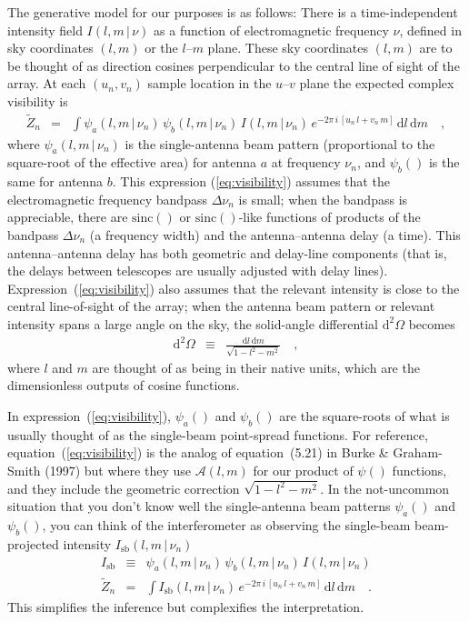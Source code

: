 \documentclass[12pt]{article}
\renewcommand{\exp}[1]{e^{#1}}
\newcommand{\sinc}{\mathrm{sinc}}
\newcommand{\given}{\,|\,}
\newcommand{\expectation}[1]{\tilde{#1}}
\newcommand{\dd}{\mathrm{d}}
\newcommand{\singlebeam}{_\mathrm{sb}}
\begin{document}
The generative model for our purposes is as follows: There is a
time-independent intensity field $I(l,m\given\nu)$ as a function of
electromagnetic frequency $\nu$, defined in sky coordinates $(l,m)$ or
the $l$--$m$ plane.  These sky coordinates $(l, m)$ are to be thought
of as direction cosines perpendicular to the central line of sight of
the array.  At each $(u_n, v_n)$ sample location in the $u$--$v$ plane
the expected complex visibility is
\begin{eqnarray}
\label{eq:visibility}
\expectation{Z}_n &=& \int \psi_a(l,m\given\nu_n)\,\psi_b(l,m\given\nu_n)\,I(l,m\given\nu_n)
                         \,\exp{-2\pi\,i\,[u_n\,l + v_n\,m]}\,\dd l\,\dd m
\quad ,
\end{eqnarray}
where $\psi_a(l,m\given\nu_n)$ is the single-antenna beam pattern
(proportional to the square-root of the effective area) for antenna
$a$ at frequency $\nu_n$, and $\psi_b()$ is the same for antenna $b$.
This expression (\ref{eq:visibility}) assumes that the electromagnetic
frequency bandpass $\Delta\nu_n$ is small; when the bandpass is
appreciable, there are $\sinc()$ or $\sinc()$-like functions of
products of the bandpass $\Delta\nu_n$ (a frequency width) and the
antenna--antenna delay (a time).  This antenna--antenna delay has both
geometric and delay-line components (that is, the delays between
telescopes are usually adjusted with delay lines).
Expression~(\ref{eq:visibility}) also assumes that the relevant
intensity is close to the central line-of-sight of the array; when the
antenna beam pattern or relevant intensity spans a large angle on the
sky, the solid-angle differential $\dd^2\Omega$ becomes
\begin{eqnarray}
\dd^2\Omega &\equiv& \frac{\dd l\,\dd m}{\sqrt{1-l^2-m^2}}
\quad ,
\end{eqnarray}
where $l$ and $m$ are thought of as being in their native units, which
are the dimensionless outputs of cosine functions.

In expression~(\ref{eq:visibility}), $\psi_a()$ and $\psi_b()$ are the
square-roots of what is usually thought of as the single-beam
point-spread functions.  For reference, equation~(\ref{eq:visibility})
is the analog of equation~(5.21) in Burke \& Graham-Smith (1997) but
where they use $\mathscr{A}(l,m)$ for our product of $\psi()$
functions, and they include the geometric correction
$\sqrt{1-l^2-m^2}$.  In the not-uncommon situation that you don't know
well the single-antenna beam patterns $\psi_a()$ and $\psi_b()$, you
can think of the interferometer as observing the single-beam
beam-projected intensity $I\singlebeam(l,m\given\nu_n)$
\begin{eqnarray}
I\singlebeam &\equiv& \psi_a(l,m\given\nu_n)\,\psi_b(l,m\given\nu_n)\,I(l,m\given\nu_n)
\\
\expectation{Z}_n &=& \int I\singlebeam(l,m\given\nu_n)
                         \,\exp{-2\pi\,i\,[u_n\,l + v_n\,m]}\,\dd l\,\dd m
\quad .
\end{eqnarray}
This simplifies the inference but complexifies the interpretation.
\end{document}
